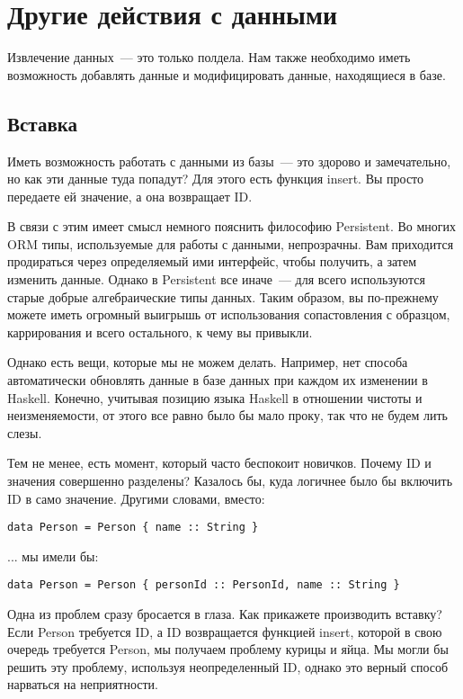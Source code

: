 \section{Другие действия с данными} %

Извлечение данных~--- это только полдела. Нам также необходимо иметь возможность добавлять данные и модифицировать данные, находящиеся в базе.

\subsection{Вставка} %

Иметь возможность работать с данными из базы~--- это здорово и замечательно, но как эти данные туда попадут? Для этого есть функция insert. Вы просто передаете ей значение, а она возвращает ID.

В связи с этим имеет смысл немного пояснить философию Persistent. Во многих ORM типы, используемые для работы с данными, непрозрачны. Вам приходится продираться через определяемый ими интерфейс, чтобы получить, а затем изменить данные. Однако в Persistent все иначе~--- для всего используются старые добрые алгебраические типы данных. Таким образом, вы по-прежнему можете иметь огромный выигрышь от использования сопастовления с образцом, каррирования и всего остального, к чему вы привыкли.

Однако есть вещи, которые мы не можем делать. Например, нет способа автоматически обновлять данные в базе данных при каждом их изменении в Haskell. Конечно, учитывая позицию языка Haskell в отношении чистоты и неизменяемости, от этого все равно было бы мало проку, так что не будем лить слезы.

Тем не менее, есть момент, который часто беспокоит новичков. Почему ID и значения совершенно разделены? Казалось бы, куда логичнее было бы включить ID в само значение. Другими словами, вместо:

\begin{lstlisting}
data Person = Person { name :: String }
\end{lstlisting}

... мы имели бы:

\begin{lstlisting}
data Person = Person { personId :: PersonId, name :: String }
\end{lstlisting}

Одна из проблем сразу бросается в глаза. Как прикажете производить вставку? Если Person требуется ID, а ID возвращается функцией insert, которой в свою очередь требуется Person, мы получаем проблему курицы и яйца. Мы могли бы решить эту проблему, используя неопределенный ID, однако это верный способ нарваться на неприятности.

